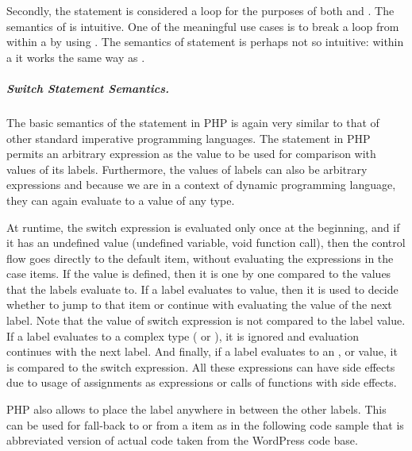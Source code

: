     Secondly, the  statement is considered 
    a loop for the purposes of both  and 
    . The semantics of  
    is intuitive. One of the meaningful use cases is to 
    break a loop from within a  by 
    using . The semantics of 
     statement 
    is perhaps not so intuitive: within a  
    it works the same way as .
    
    \subparagraph*{Switch Statement Semantics.} 
    The basic semantics of the  statement in PHP is 
    again very similar to that of other standard imperative 
    programming languages. The  statement in PHP 
    permits an arbitrary expression as the value to be used 
    for comparison with values of its  labels. Furthermore, 
    the values of  labels can also be arbitrary 
    expressions and because we are in a context of dynamic 
    programming language, they can again evaluate to a value 
    of any type.
    
    At runtime, the switch expression is evaluated only once 
    at the beginning, and if it has an undefined value (undefined variable, 
    void function call), then the control flow goes directly 
    to the default item, without evaluating the expressions 
    in the case items. If the value is defined, then it is 
    one by one compared to the values that the 
     labels evaluate to. If a  label evaluates 
    to  value, then it is used to decide whether to 
    jump to that  item or continue with evaluating 
    the value of the next  label. Note that the value of 
    switch expression is not compared to the  label value. 
    If a  label evaluates to a complex type ( or ), 
    it is ignored and evaluation continues with the next  label. 
    And finally, if a  label evaluates to an 
    ,  or  value, it is 
    compared to the switch expression. All these expressions can 
    have side effects due to usage of assignments as expressions 
    or calls of functions with side effects. 
    
    PHP also allows to place the  label anywhere in between 
    the other  labels. This can be used for fall-back 
    to or from a  item as in the following code sample 
    that is abbreviated version of actual code taken from the 
    WordPress\cite{wordpress} code base.
    
